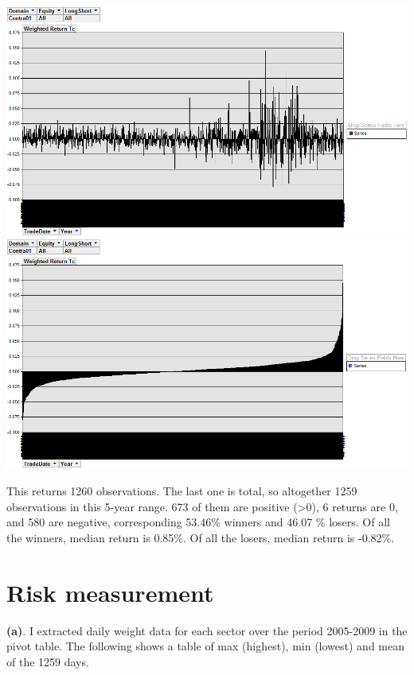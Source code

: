 \documentclass[11pt,letter]{article}
\begin{document}
\begin{center}
\includegraphics[scale=0.5,keepaspectratio]{2d}
\includegraphics[scale=0.5,keepaspectratio]{2d_2}
\end{center}

This returns 1260 observations. The last one is total, so altogether 1259 observations in this 5-year range. 673 of them are positive (>0), 6 returns are 0, and 580 are negative, corresponding 53.46\% winners and 46.07 \% losers. Of all the winners, median return is 0.85\%. Of all the losers, median return is -0.82\%.

\section{Risk measurement}

\textbf{(a)}. I extracted daily weight data for each sector over the period 2005-2009 in the pivot table. The following shows a table of max (highest), min (lowest) and mean of the 1259 days.
\end{document}
